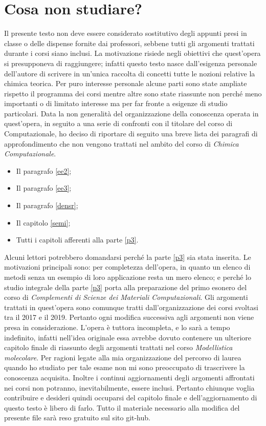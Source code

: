 \documentclass[oneside]{amsbook}
\numberwithin{section}{chapter}
\numberwithin{equation}{section}
\numberwithin{figure}{section}
\begin{document}
\chapter*{Cosa non studiare?}
Il presente testo non deve essere considerato sostitutivo degli appunti presi in classe o delle dispense fornite dai professori, sebbene tutti gli argomenti trattati durante i corsi siano inclusi. La motivazione risiede negli obiettivi che quest'opera si presupponeva di raggiungere; infatti questo testo nasce dall'esigenza personale dell'autore di scrivere in un'unica raccolta di concetti tutte le nozioni relative la chimica teorica. Per puro interesse personale alcune parti sono state ampliate rispetto il programma dei corsi mentre altre sono state riassunte non perché meno importanti o di limitato interesse ma per far fronte a esigenze di studio particolari. Data la non generalità del organizzazione della conoscenza operata in quest'opera, in seguito a una serie di confronti con il titolare del corso di Computazionale, ho deciso di riportare di seguito una breve lista dei paragrafi di approfondimento che non vengono trattati nel ambito del corso di \emph{Chimica Computazionale}.
\begin{itemize}
\item Il paragrafo \ref{ee2};
\item Il paragrafo \ref{ee3};
\item Il paragrafo \ref{densr};
\item Il capitolo \ref{semi};
\item Tutti i capitoli afferenti alla parte \ref{p3}.
\end{itemize}
Alcuni lettori potrebbero domandarsi perché la parte \ref{p3} sia stata inserita. Le motivazioni principali sono: per completezza dell'opera, in quanto un elenco di metodi senza un esempio di loro applicazione resta un mero elenco; e perché lo studio integrale della parte \ref{p3} porta alla preparazione del primo esonero del corso di \emph{Complementi di Scienze dei Materiali Computazionali}.
Gli argomenti trattati in quest'opera sono comunque tratti dall'organizzazione dei corsi svoltasi tra il 2017 e il 2019. Pertanto ogni modifica successiva agli argomenti non viene presa in considerazione.
L'opera è tuttora incompleta, e lo sarà a tempo indefinito, infatti nell'idea originale essa avrebbe dovuto contenere un ulteriore capitolo finale di riassunto degli argomenti trattati nel corso \emph{Modellistica molecolare}. Per ragioni legate alla mia organizzazione del percorso di laurea quando ho studiato per tale esame non mi sono preoccupato di trascrivere la conoscenza acquisita. Inoltre i continui aggiornamenti degli argomenti affrontati nei corsi non potranno, inevitabilmente, essere inclusi.  Pertanto chiunque voglia contribuire e desideri quindi occuparsi del capitolo finale e dell'aggiornamento di questo testo è libero di farlo. Tutto il materiale necessario alla modifica del presente file sarà reso gratuito sul sito git-hub.
\end{document}
